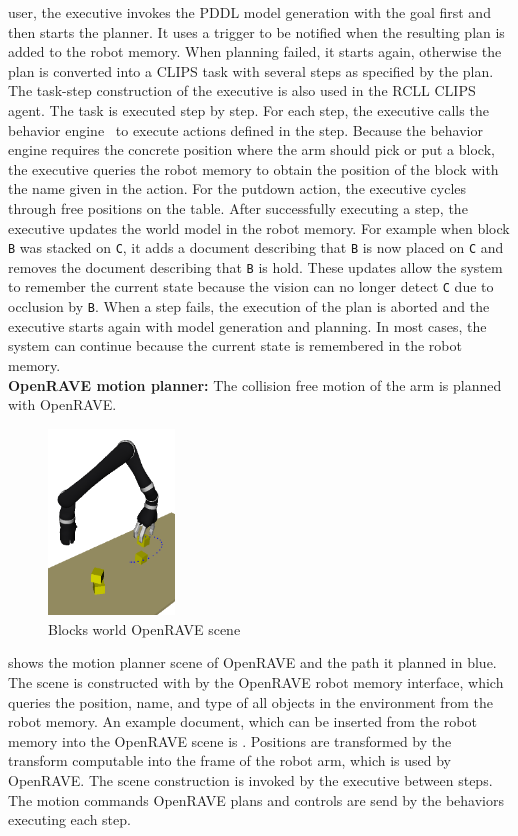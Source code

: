user, the executive invokes the PDDL model generation with the goal
first and then starts the planner. It uses a trigger to be notified
when the resulting plan is added to the robot memory. When planning
failed, it starts again, otherwise the plan is converted into a CLIPS
task with several steps as specified by the plan. The task-step
construction of the executive is also used in the RCLL CLIPS
agent. The task is executed step by step. For each step, the executive
calls the behavior engine~\cite{Behavior-Engine} to execute actions
defined in the step. Because the behavior engine requires the concrete
position where the arm should pick or put a block, the executive
queries the robot memory to obtain the position of the block with the
name given in the action. For the putdown action, the executive cycles
through free positions on the table. After successfully executing a
step, the executive updates the world model in the robot memory. For
example when block \texttt{B} was stacked on \texttt{C}, it adds a
document describing that \texttt{B} is now placed on \texttt{C} and
removes the document describing that \texttt{B} is hold. These updates
allow the system to remember the current state because the vision can
no longer detect \texttt{C} due to occlusion by \texttt{B}. When a
step fails, the execution of the plan is aborted and the executive
starts again with model generation and planning. In most cases, the
system can continue because the current state is remembered in the
robot memory.
\\
\textbf{OpenRAVE motion planner:} The collision free motion of the arm
is planned with OpenRAVE.
\begin{figure}
  \centering
  \vspace{-4mm}
  \includegraphics[width=0.3\textwidth]{img/openrave-blocks}%
  \caption[Blocks world OpenRAVE scene]{Blocks world OpenRAVE scene}
  \vspace{-4mm}
  \label{fig:openrave}
\end{figure}
 shows the motion planner scene of OpenRAVE
and the path it planned in blue. The scene is constructed with by the OpenRAVE
robot memory interface, which queries the position, name, and type of
all objects in the environment from the robot memory. An example
document, which can be inserted from the robot memory into the
OpenRAVE scene is . Positions are
transformed by the transform computable into the frame of the robot
arm, which is used by OpenRAVE. The scene construction is invoked by
the executive between steps. The motion commands OpenRAVE plans and
controls are send by the behaviors executing each step.